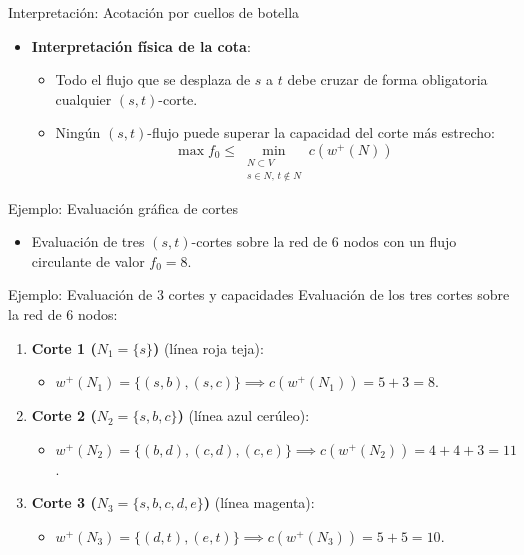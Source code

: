 \documentclass[
  ignorenonframetext,
]{beamer}
\providecommand{\tightlist}{%
  \setlength{\itemsep}{0pt}\setlength{\parskip}{0pt}}
\begin{document}
\begin{frame}{Interpretación: Acotación por cuellos de botella}
\label{interpretaciuxf3n-acotaciuxf3n-por-cuellos-de-botella}
\begin{itemize}
\tightlist
\item
  \textbf{Interpretación física de la cota}:

  \begin{itemize}
  \tightlist
  \item
    Todo el flujo que se desplaza de \(s\) a \(t\) debe cruzar de forma
    obligatoria cualquier \((s, t)\)-corte.
  \item
    Ningún \((s, t)\)-flujo puede superar la capacidad del corte más
    estrecho:
    \[\max f_0 \le \min_{\substack{N \subset V \\ s \in N, \, t \notin N}} c(w^+(N))\]
  \end{itemize}
\end{itemize}
\end{frame}

\begin{frame}{Ejemplo: Evaluación gráfica de cortes}
\label{ejemplo-evaluaciuxf3n-gruxe1fica-de-cortes}
\begin{itemize}
\tightlist
\item
  Evaluación de tres \((s, t)\)-cortes sobre la red de 6 nodos con un
  flujo circulante de valor \(f_0 = 8\).
\end{itemize}
\end{frame}

\begin{frame}{Ejemplo: Evaluación de 3 cortes y capacidades}
\label{ejemplo-evaluaciuxf3n-de-3-cortes-y-capacidades}
Evaluación de los tres cortes sobre la red de 6 nodos:

\begin{enumerate}
\tightlist
\item
  \textbf{Corte 1 (\(N_1 = \{s\}\))} (línea roja teja):

  \begin{itemize}
  \tightlist
  \item
    \(w^+(N_1) = \{(s, b), (s, c)\} \implies c(w^+(N_1)) = 5 + 3 = 8\).
  \end{itemize}
\item
  \textbf{Corte 2 (\(N_2 = \{s, b, c\}\))} (línea azul cerúleo):

  \begin{itemize}
  \tightlist
  \item
    \(w^+(N_2) = \{(b, d), (c, d), (c, e)\} \implies c(w^+(N_2)) = 4 + 4 + 3 = 11\).
  \end{itemize}
\item
  \textbf{Corte 3 (\(N_3 = \{s, b, c, d, e\}\))} (línea magenta):

  \begin{itemize}
  \tightlist
  \item
    \(w^+(N_3) = \{(d, t), (e, t)\} \implies c(w^+(N_3)) = 5 + 5 = 10\).
  \end{itemize}
\end{enumerate}
\end{frame}
\end{document}
